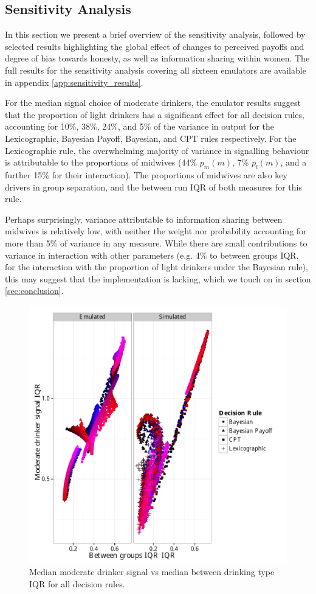 \subsection{Sensitivity Analysis}
\label{sub:sa_results}

In this section we present a brief overview of the sensitivity analysis, followed by selected results highlighting the global effect of changes to perceived payoffs and degree of bias towards honesty, as well as information sharing within women. The full results for the sensitivity analysis covering all sixteen emulators are available in appendix \ref{app:sensitivity_results}.

For the median signal choice of moderate drinkers, the emulator results suggest that the proportion of light drinkers has a significant effect for all decision rules, accounting for 10\%, 38\%, 24\%, and 5\% of the variance in output for the Lexicographic, Bayesian Payoff, Bayesian, and \ac{CPT} rules respectively. For the Lexicographic rule, the overwhelming majority of variance in signalling behaviour is attributable to the proportions of midwives (44\% \(p_{m}(m)\), 7\% \(p_{l}(m)\), and a further 15\% for their interaction).  The proportions of midwives are also key drivers in group separation, and the between run IQR of both measures for this rule.

Perhaps surprisingly, variance attributable to information sharing between midwives is relatively low, with neither the weight nor probability accounting for more than 5\% of variance in any measure. While there are small contributions to variance in interaction with other parameters (e.g. 4\% to between groups IQR, for the interaction with the proportion of light drinkers under the Bayesian rule), this may suggest that the implementation is lacking, which we touch on in section \ref{sec:conclusion}.

\begin{figure}[H]
\begin{adjustbox}{center}\includegraphics[width=0.8\linewidth]{figures/sharing_emulated_simulated}\end{adjustbox}
\caption{Median moderate drinker signal vs median between drinking type IQR for all decision rules.}
\label{fig:outcome_plots}
\end{figure}

